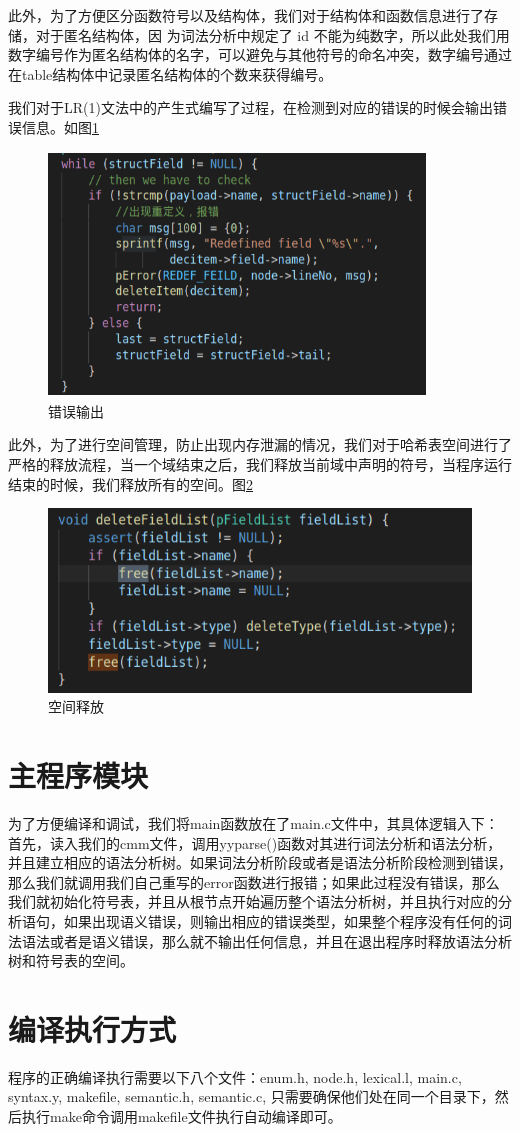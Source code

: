 \documentclass[lang=cn,11pt,a4paper,cite=authoryear]{elegantpaper}
\begin{document}
此外，为了方便区分函数符号以及结构体，我们对于结构体和函数信息进行了存储，对于匿名结构体，因
为词法分析中规定了 id 不能为纯数字，所以此处我们用数字编号作为匿名结构体的名字，可以避免与其他符号的命名冲突，数字编号通过在table结构体中记录匿名结构体的个数来获得编号。

我们对于LR(1)文法中的产生式编写了过程，在检测到对应的错误的时候会输出错误信息。如图\ref{pic2}
\begin{figure}[h]
	\centering
	\includegraphics[height=6.5cm,width=10cm]{pics//22.png}
	\caption{错误输出}
	\label{pic2}
\end{figure}

此外，为了进行空间管理，防止出现内存泄漏的情况，我们对于哈希表空间进行了严格的释放流程，当一个域结束之后，我们释放当前域中声明的符号，当程序运行结束的时候，我们释放所有的空间。图\ref{pic3}
\begin{figure}[h]
	\centering
	\includegraphics[width=\textwidth]{pics//33.png}
	\caption{空间释放}
	\label{pic3}
\end{figure}



\section{主程序模块}
为了方便编译和调试，我们将main函数放在了main.c文件中，其具体逻辑入下：首先，读入我们的cmm文件，调用yyparse()函数对其进行词法分析和语法分析，并且建立相应的语法分析树。如果词法分析阶段或者是语法分析阶段检测到错误，那么我们就调用我们自己重写的error函数进行报错；如果此过程没有错误，那么我们就初始化符号表，并且从根节点开始遍历整个语法分析树，并且执行对应的分析语句，如果出现语义错误，则输出相应的错误类型，如果整个程序没有任何的词法语法或者是语义错误，那么就不输出任何信息，并且在退出程序时释放语法分析树和符号表的空间。
\section{编译执行方式}
程序的正确编译执行需要以下八个文件：enum.h, node.h, lexical.l, main.c, syntax.y, makefile, semantic.h, semantic.c, 只需要确保他们处在同一个目录下，然后执行make命令调用makefile文件执行自动编译即可。
\end{document}
